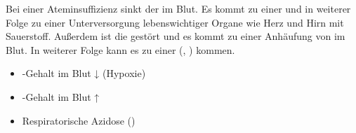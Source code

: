 {%
Bei einer Ateminsuffizienz sinkt der  im
Blut. Es kommt zu einer  und in weiterer Folge
zu einer Unterversorgung lebenswichtiger Organe wie Herz und
Hirn mit Sauerstoff.
Außerdem ist die  gestört und es kommt
zu einer Anhäufung von  im Blut. In weiterer Folge
kann es zu einer 
(,
) kommen.
}{
\begin{itemize}
    \item {}-Gehalt im Blut ↓ (Hypoxie)
    \item {}-Gehalt im Blut ↑
    \item Respiratorische Azidose
    ()
\end{itemize}
}{}{}{}





